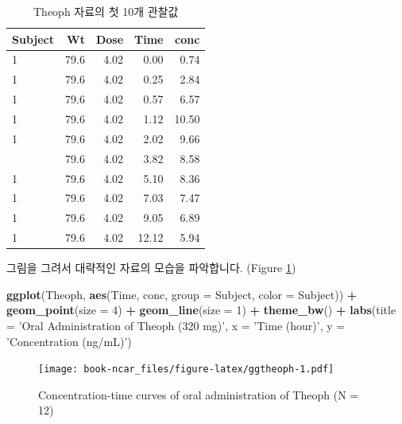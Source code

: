 \documentclass[12pt,]{krantz}
\newenvironment{Shaded}{\begin{snugshade}}{\end{snugshade}}
\newcommand{\KeywordTok}[1]{\textcolor[rgb]{0.13,0.29,0.53}{\textbf{#1}}}
\newcommand{\DataTypeTok}[1]{\textcolor[rgb]{0.13,0.29,0.53}{#1}}
\newcommand{\DecValTok}[1]{\textcolor[rgb]{0.00,0.00,0.81}{#1}}
\newcommand{\StringTok}[1]{\textcolor[rgb]{0.31,0.60,0.02}{#1}}
\newcommand{\OperatorTok}[1]{\textcolor[rgb]{0.81,0.36,0.00}{\textbf{#1}}}
\newcommand{\NormalTok}[1]{#1}
\theoremstyle{definition}
\theoremstyle{definition}
\theoremstyle{definition}
\theoremstyle{remark}
\begin{document}
\begin{table}

\caption{\label{tab:head}Theoph 자료의 첫 10개 관찰값}
\centering
\begin{tabular}[t]{lrrrr}
\toprule
Subject & Wt & Dose & Time & conc\\
\midrule
1 & 79.6 & 4.02 & 0.00 & 0.74\\
1 & 79.6 & 4.02 & 0.25 & 2.84\\
1 & 79.6 & 4.02 & 0.57 & 6.57\\
1 & 79.6 & 4.02 & 1.12 & 10.50\\
1 & 79.6 & 4.02 & 2.02 & 9.66\\
\addlinespace
1 & 79.6 & 4.02 & 3.82 & 8.58\\
1 & 79.6 & 4.02 & 5.10 & 8.36\\
1 & 79.6 & 4.02 & 7.03 & 7.47\\
1 & 79.6 & 4.02 & 9.05 & 6.89\\
1 & 79.6 & 4.02 & 12.12 & 5.94\\
\bottomrule
\end{tabular}
\end{table}

그림을 그려서 대략적인 자료의 모습을 파악합니다. (Figure
\ref{fig:ggtheoph})

\begin{Shaded}
\begin{Highlighting}[]
\KeywordTok{ggplot}\NormalTok{(Theoph, }\KeywordTok{aes}\NormalTok{(Time, conc, }\DataTypeTok{group =}\NormalTok{ Subject, }\DataTypeTok{color =}\NormalTok{ Subject)) }\OperatorTok{+}
\StringTok{  }\KeywordTok{geom_point}\NormalTok{(}\DataTypeTok{size =} \DecValTok{4}\NormalTok{) }\OperatorTok{+}\StringTok{ }
\StringTok{  }\KeywordTok{geom_line}\NormalTok{(}\DataTypeTok{size =} \DecValTok{1}\NormalTok{) }\OperatorTok{+}
\StringTok{  }\KeywordTok{theme_bw}\NormalTok{() }\OperatorTok{+}
\StringTok{  }\KeywordTok{labs}\NormalTok{(}\DataTypeTok{title =} \StringTok{'Oral Administration of Theoph (320 mg)'}\NormalTok{,}
       \DataTypeTok{x =} \StringTok{'Time (hour)'}\NormalTok{, }\DataTypeTok{y =} \StringTok{'Concentration (ng/mL)'}\NormalTok{)}
\end{Highlighting}
\end{Shaded}

\begin{figure}
\centering
\texttt{[image: book-ncar\_files/figure-latex/ggtheoph-1.pdf]}
\caption{\label{fig:ggtheoph}Concentration-time curves of oral
administration of Theoph (N = 12)}
\end{figure}
\end{document}
